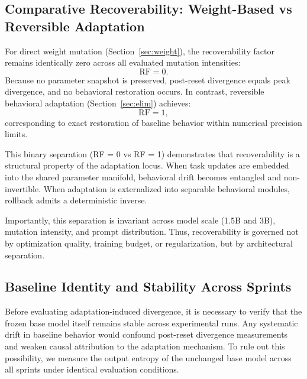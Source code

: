 \documentclass[10pt]{article}
\begin{document}
	
	\subsection{Comparative Recoverability: Weight-Based vs Reversible Adaptation}
	\label{sec:rf}
	
	\begin{table}[H]
		\centering
		\footnotesize
		
		\vspace{5pt}
		\caption{
			Recoverability factor comparison across adaptation mechanisms.
			Weight-based adaptation exhibits zero recoverability (RF = 0),
			while reversible behavioral adaptation achieves exact recovery (RF = 1) within numerical precision limits.
		}
		\label{tab:rfc}
	\end{table}
	
	\FloatBarrier
	
	For direct weight mutation (Section~\ref{sec:weight}), the recoverability factor remains identically zero across all evaluated mutation intensities:
	\[
	\mathrm{RF} = 0.
	\]
	Because no parameter snapshot is preserved, post-reset divergence equals peak divergence, and no behavioral restoration occurs. In contrast, reversible behavioral adaptation (Section~\ref{sec:elim}) achieves:
	\[
	\mathrm{RF} = 1,
	\]
	corresponding to exact restoration of baseline behavior
	within numerical precision limits.
	
	This binary separation (RF = 0 vs RF = 1)
	demonstrates that recoverability is a structural property of
	the adaptation locus.
	When task updates are embedded into the shared parameter manifold,
	behavioral drift becomes entangled and non-invertible.
	When adaptation is externalized into separable behavioral modules,
	rollback admits a deterministic inverse.
	
	Importantly, this separation is invariant across model scale
	(1.5B and 3B), mutation intensity, and prompt distribution.
	Thus, recoverability is governed not by optimization quality,
	training budget, or regularization,
	but by architectural separation.
	
	\subsection{Baseline Identity and Stability Across Sprints}
	\label{sec:baseline}
	
	Before evaluating adaptation-induced divergence, it is necessary to verify that the frozen base model itself remains stable across experimental runs. Any systematic drift in baseline behavior would confound post-reset divergence measurements and weaken causal attribution to the adaptation mechanism. To rule out this possibility, we measure the output entropy of the unchanged base model across all sprints under identical evaluation conditions.
	
\end{document}
